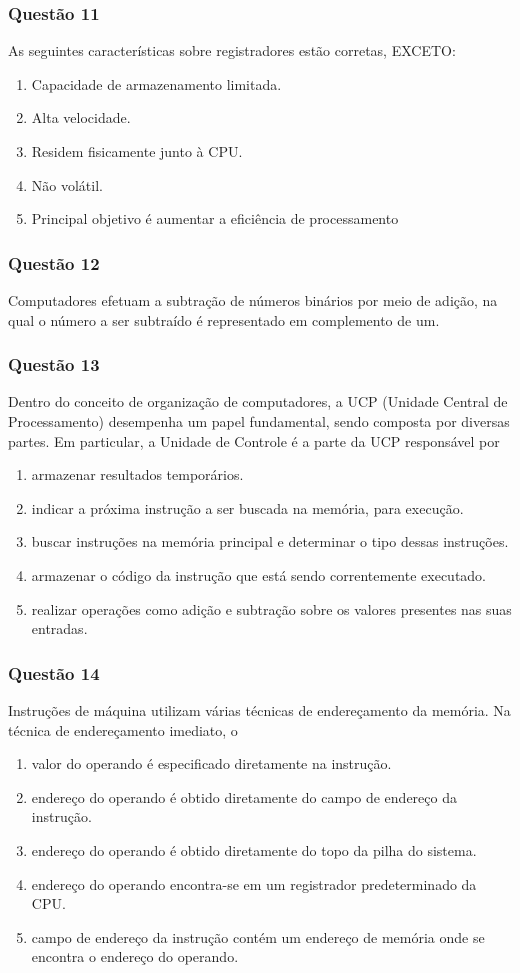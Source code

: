 \documentclass[	aspectratio=169,
				xcolor=table]{beamer}
\begin{document}
	\begin{frame}
		\frametitle{Questão 11}
		As seguintes características sobre registradores estão corretas, EXCETO: 
		
		\begin{enumerate}[a]
			\item Capacidade de armazenamento limitada.
			\item Alta velocidade.
			\item Residem fisicamente junto à CPU.
			\item Não volátil.			
			\item Principal objetivo é aumentar a eficiência de processamento
		\end{enumerate}
	\end{frame}
	
	\begin{frame}
		\frametitle{Questão 12}
		Computadores efetuam a subtração de números binários por meio de adição, na qual o número a ser subtraído é representado em complemento de um.
	\end{frame}
	
	\begin{frame}
		\frametitle{Questão 13}
		Dentro do conceito de organização de computadores, a UCP (Unidade Central de Processamento) desempenha um papel fundamental, sendo composta por diversas partes. Em particular, a Unidade de Controle é a parte da UCP responsável por
		\begin{enumerate}[a]
			\item armazenar resultados temporários.
			\item indicar a próxima instrução a ser buscada na memória, para execução.
			\item buscar instruções na memória principal e determinar o tipo dessas instruções.
			\item armazenar o código da instrução que está sendo correntemente executado.
			\item realizar operações como adição e subtração sobre os valores presentes nas suas entradas.

			
		\end{enumerate}
	\end{frame}

	\begin{frame}
		\frametitle{Questão 14}
		Instruções de máquina utilizam várias técnicas de endereçamento da memória.  Na técnica de endereçamento imediato, o
		\begin{enumerate}[a]
			\item valor do operando é especificado diretamente na instrução.
			\item endereço do operando é obtido diretamente do campo de endereço da instrução.
			\item endereço do operando é obtido diretamente do topo da pilha do sistema.
			\item endereço do operando encontra-se em um registrador predeterminado da CPU.
			\item campo de endereço da instrução contém um endereço de memória onde se encontra o endereço do operando.			
		\end{enumerate}
	\end{frame}
	
\end{document}
